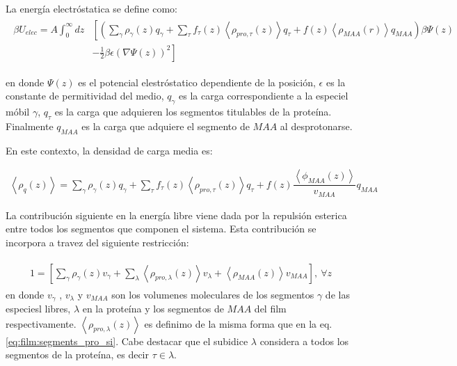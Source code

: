 La energ\'ia electr\'ostatica se define como:
\begin{align}
	\begin{aligned}
		\beta U_{elec}= A\int_0^\infty dz&\left[\left(\sum_{\gamma } {\rho_\gamma(z) q_\gamma + \sum_\tau{f_\tau(z) \left<\rho_{pro,\tau}(z)\right> q_\tau} +  f(z)\left<\rho_{MAA}(r)\right>q_{MAA}}\right)\beta\Psi(z) \right. \\ &\left.-\frac{1}{2}\beta\epsilon(\nabla\Psi(z))^2 \right]
	\end{aligned}
\end{align} 

\noindent en donde $\Psi(z)$ es el potencial elestr\'ostatico dependiente de la posici\'on, $\epsilon$ es la constante de permitividad del medio, $q_\gamma$ es la carga correspondiente a la especiel m\'obil $\gamma$, $q_\tau$ es la carga que adquieren los segmentos titulables de la prote\'ina. Finalmente $q_{MAA}$ es la carga que adquiere el segmento de $MAA$ al desprotonarse.


En este contexto, la densidad de carga media es:

\begin{align}
	\left<\rho_q(z)\right> = \sum_{\gamma } {\rho_\gamma(z) q_\gamma + \sum_\tau{f_\tau(z) \left<\rho_{pro,\tau}(z)\right> q_\tau} +  f(z)\dfrac{\left<\phi_{MAA}(z)\right>}{v_{MAA}}q_{MAA}}
	\label{eq:film:rho_charge}
\end{align}

La contribuci\'on siguiente en la energ\'ia libre viene dada por la repulsi\'on esterica entre  todos los segmentos que componen  el sistema. Esta contribuci\'on se incorpora a travez del siguiente restricci\'on:  

\begin{align}
	\begin{aligned}
		1=  {\left[\sum_{\gamma}\rho_\gamma(z) v_\gamma + \sum_\lambda{\left<\rho_{pro,\lambda}(z)\right>v_\lambda} + \left<\rho_{MAA}(z)\right>v_{MAA} \right]},~ \forall z
	\end{aligned}
	\label{eq:film:constraint}
\end{align}
\noindent en donde $v_\gamma$ , $v_\lambda$ y $v_{MAA}$ son los volumenes moleculares de los segmentos $\gamma$ de las especiesl libres, $\lambda$  en la prote\'ina y los segmentos de $MAA$ del film respectivamente.
$\left<\rho_{pro,\lambda}(z)\right>$ es definimo de la misma forma que en la eq.  \ref{eq:film:segments_pro_si}.
Cabe destacar que el subidice $\lambda$ considera a todos los segmentos de la prote\'ina, es decir $ \tau \in \lambda$.

